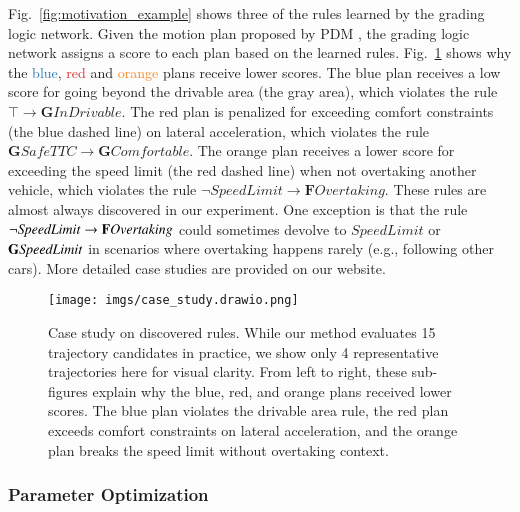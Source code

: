 Fig.~\ref{fig:motivation_example} shows three of the rules learned by the grading logic network. Given the motion plan proposed by PDM \cite{Dauner2023CORL}, the grading logic network assigns a score to each plan based on the learned rules. Fig.~\ref{fig:case-study-example} shows why the \textcolor[HTML]{2278B4}{blue}, \textcolor[HTML]{D52928}{red} and \textcolor[HTML]{F98217}{orange} plans receive lower scores. The blue plan receives a low score for going beyond the drivable area (the gray area), which violates the rule $\top \rightarrow \mathbf{G} \mathit{InDrivable}$. The red plan is penalized for exceeding comfort constraints (the blue dashed line) on lateral acceleration, which violates the rule $\mathbf{G} \mathit{SafeTTC} \rightarrow \mathbf{G} \mathit{Comfortable}$. The orange plan receives a lower score for exceeding the speed limit (the red dashed line) when not overtaking another vehicle, which violates the rule $\lnot \mathit{SpeedLimit} \rightarrow \mathbf{F} \mathit{Overtaking}$. These rules are almost always discovered in our experiment. One exception is that the rule $\lnot \mathit{SpeedLimit} \rightarrow \mathbf{F} \mathit{Overtaking}$ could sometimes devolve to  $\mathit{SpeedLimit}$ or $\mathbf{G} \mathit{SpeedLimit}$   in scenarios where overtaking happens rarely (e.g., following other cars). More detailed case studies are provided on our website.

\begin{figure}[h!]
    \centering
    \texttt{[image: imgs/case\_study.drawio.png]}
    \caption{
        Case study on discovered rules. While our method evaluates 15 trajectory candidates in practice, we show only 4 representative trajectories here for visual clarity. From left to right, these sub-figures explain why the blue, red, and orange plans received lower scores. The blue plan violates the drivable area rule, the red plan exceeds comfort constraints on lateral acceleration, and the orange plan breaks the speed limit without overtaking context.
    }
    \label{fig:case-study-example}
\end{figure}


\subsubsection{Parameter Optimization}

